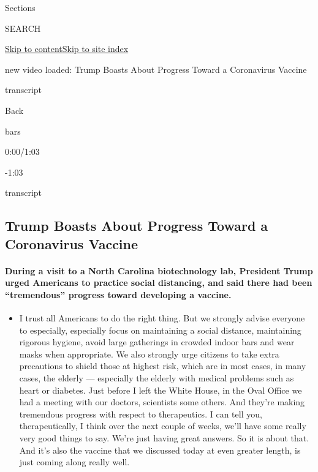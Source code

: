 Sections

SEARCH

\protect\hyperlink{site-content}{Skip to
content}\protect\hyperlink{site-index}{Skip to site index}

new video loaded: Trump Boasts About Progress Toward a Coronavirus
Vaccine

transcript

Back

bars

0:00/1:03

-1:03

transcript

\hypertarget{trump-boasts-about-progress-toward-a-coronavirus-vaccine}{%
\subsection{Trump Boasts About Progress Toward a Coronavirus
Vaccine}\label{trump-boasts-about-progress-toward-a-coronavirus-vaccine}}

\hypertarget{during-a-visit-to-a-north-carolina-biotechnology-lab-president-trump-urged-americans-to-practice-social-distancing-and-said-there-had-been-tremendous-progress-toward-developing-a-vaccine}{%
\paragraph{During a visit to a North Carolina biotechnology lab,
President Trump urged Americans to practice social distancing, and said
there had been ``tremendous'' progress toward developing a
vaccine.}\label{during-a-visit-to-a-north-carolina-biotechnology-lab-president-trump-urged-americans-to-practice-social-distancing-and-said-there-had-been-tremendous-progress-toward-developing-a-vaccine}}

\begin{itemize}
\tightlist
\item
  I trust all Americans to do the right thing. But we strongly advise
  everyone to especially, especially focus on maintaining a social
  distance, maintaining rigorous hygiene, avoid large gatherings in
  crowded indoor bars and wear masks when appropriate. We also strongly
  urge citizens to take extra precautions to shield those at highest
  risk, which are in most cases, in many cases, the elderly ---
  especially the elderly with medical problems such as heart or
  diabetes. Just before I left the White House, in the Oval Office we
  had a meeting with our doctors, scientists some others. And they're
  making tremendous progress with respect to therapeutics. I can tell
  you, therapeutically, I think over the next couple of weeks, we'll
  have some really very good things to say. We're just having great
  answers. So it is about that. And it's also the vaccine that we
  discussed today at even greater length, is just coming along really
  well.
\end{itemize}

